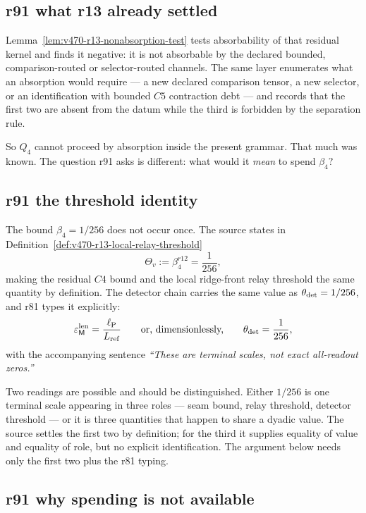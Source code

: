 \subsection*{r91 what r13 already settled}
\label{subsec:r91-what-r13-settled}

Lemma~\ref{lem:v470-r13-nonabsorption-test} tests absorbability of that residual kernel and
finds it negative: it is not absorbable by the declared bounded, comparison-routed or
selector-routed channels.  The same layer enumerates what an absorption would require --- a
new declared comparison tensor, a new selector, or an identification with bounded \(C5\)
contraction debt --- and records that the first two are absent from the datum while the third
is forbidden by the separation rule.

So \(Q_4\) cannot proceed by absorption inside the present grammar.  That much was known.
The question r91 asks is different: what would it \emph{mean} to spend \(\beta_4\)?

\subsection*{r91 the threshold identity}
\label{subsec:r91-threshold-identity}

The bound \(\beta_4=1/256\) does not occur once.  The source states in
Definition~\ref{def:v470-r13-local-relay-threshold}
\[
\Theta_v:=\beta_4^{r12}=\frac1{256},
\]
making the residual \(C4\) bound and the local ridge-front relay threshold the same quantity
by definition.  The detector chain carries the same value as \(\theta_{\rm det}=1/256\), and
r81 types it explicitly:
\[
\varepsilon_{\mathsf M}^{\rm len}=\frac{\ell_{\rm P}}{L_{\rm ref}}
\qquad\text{or, dimensionlessly,}\qquad
\theta_{\rm det}=\frac1{256},
\]
with the accompanying sentence \emph{``These are terminal scales, not exact all-readout
zeros.''}

Two readings are possible and should be distinguished.  Either \(1/256\) is one terminal
scale appearing in three roles --- seam bound, relay threshold, detector threshold --- or it is
three quantities that happen to share a dyadic value.  The source settles the first two by
definition; for the third it supplies equality of value and equality of role, but no explicit
identification.  The argument below needs only the first two plus the r81 typing.

\subsection*{r91 why spending is not available}
\label{subsec:r91-why-not-spendable}

